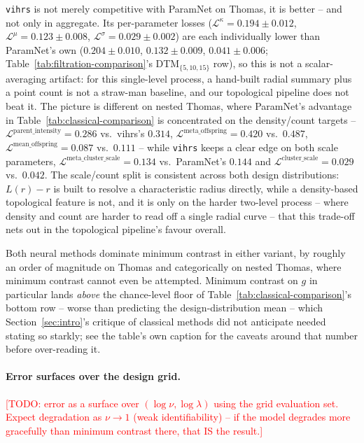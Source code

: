 \documentclass[11pt,letterpaper]{article}
\newcommand{\1}{\mathds{1}}
\newcommand{\todo}[1]{\textcolor{red}{[TODO: #1]}}
\newcommand{\fix}[1]{\textcolor{blue}{[FIX: #1]}}
\newcommand{\todo}[1]{}\newcommand{\fix}[1]{}
\theoremstyle{plain}
\theoremstyle{definitioncolon}
\begin{document}
\texttt{vihrs} is not merely competitive with ParamNet on Thomas, it is
better -- and not only in aggregate. Its per-parameter losses
($\mathcal{L}^\kappa=0.194\pm0.012$, $\mathcal{L}^\mu=0.123\pm0.008$,
$\mathcal{L}^\sigma=0.029\pm0.002$) are each individually lower than
ParamNet's own ($0.204\pm0.010$, $0.132\pm0.009$, $0.041\pm0.006$;
Table~\ref{tab:filtration-comparison}'s DTM$_{\{5,10,15\}}$ row), so this is
not a scalar-averaging artifact: for this single-level process, a hand-built
radial summary plus a point count is not a straw-man baseline, and our
topological pipeline does not beat it. The picture is different on nested
Thomas, where ParamNet's advantage in Table~\ref{tab:classical-comparison}
is concentrated on the density/count targets --
$\mathcal{L}^{\text{parent\_intensity}}=0.286$ vs.\ vihrs's $0.314$,
$\mathcal{L}^{\text{meta\_offspring}}=0.420$ vs.\ $0.487$,
$\mathcal{L}^{\text{mean\_offspring}}=0.087$ vs.\ $0.111$ -- while
\texttt{vihrs} keeps a clear edge on both scale parameters,
$\mathcal{L}^{\text{meta\_cluster\_scale}}=0.134$ vs.\ ParamNet's $0.144$ and
$\mathcal{L}^{\text{cluster\_scale}}=0.029$ vs.\ $0.042$. The scale/count
split is consistent across both design distributions: $L(r)-r$ is built to
resolve a characteristic radius directly, while a density-based topological
feature is not, and it is only on the harder two-level process -- where
density and count are harder to read off a single radial curve -- that this
trade-off nets out in the topological pipeline's favour overall.

Both neural methods dominate minimum contrast in either variant, by roughly
an order of magnitude on Thomas and categorically on nested Thomas, where
minimum contrast cannot even be attempted. Minimum contrast on $g$ in
particular lands \emph{above} the chance-level floor of
Table~\ref{tab:classical-comparison}'s bottom row -- worse than predicting
the design-distribution mean -- which Section~\ref{sec:intro}'s critique of
classical methods did not anticipate needed stating so starkly; see the
table's own caption for the caveats around that number before over-reading
it.

\paragraph{Error surfaces over the design grid.}
\todo{error as a surface over $(\log\nu, \log\lambda)$ using the grid evaluation
set. Expect degradation as $\nu \to 1$ (weak identifiability) -- if the model
degrades more gracefully than minimum contrast there, that IS the result.}
\end{document}
